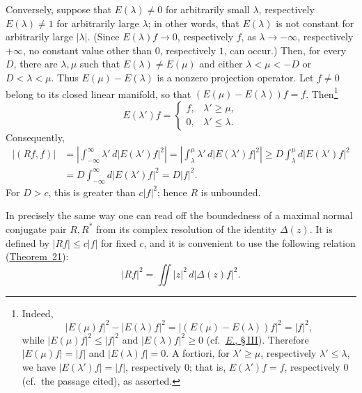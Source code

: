 \documentclass[
  paper=b5,
  twoside=true,
  fontsize=13pt,
  headings=normal,
  bookmarkpackage=false
]{scrartcl}
\theoremstyle{definition}
\newcommand{\TheoremRef}[1]{\hyperref[thm:#1]{Theorem~#1}}
\newcommand{\ErefText}[1]{\href{https://doi.org/10.1007/BF01782338}{#1}}
\begin{document}
Conversely, suppose that \(E(\lambda)\neq0\) for arbitrarily small
\(\lambda\), respectively \(E(\lambda)\neq1\) for arbitrarily large
\(\lambda\); in other words, that \(E(\lambda)\) is not constant for
arbitrarily large \(\lvert\lambda\rvert\).  (Since
\(E(\lambda)f\to0\), respectively \(f\), as
\(\lambda\to-\infty\), respectively \(+\infty\), no constant value other
than \(0\), respectively \(1\), can occur.)  Then, for every \(D\), there
are \(\lambda,\mu\) such that \(E(\lambda)\neq E(\mu)\) and either
\(\lambda<\mu<-D\) or \(D<\lambda<\mu\).  Thus \(E(\mu)-E(\lambda)\) is a
nonzero projection operator.  Let \(f\neq0\) belong to its closed linear
manifold, so that \((E(\mu)-E(\lambda))f=f\).
Then\footnote{\label{fn:70}Indeed,
\[
  \lvert E(\mu)f\rvert^{2}-\lvert E(\lambda)f\rvert^{2}
  =
  \lvert(E(\mu)-E(\lambda))f\rvert^{2}
  =
  \lvert f\rvert^{2},
\]
while \(\lvert E(\mu)f\rvert^{2}\leq\lvert f\rvert^{2}\) and
\(\lvert E(\lambda)f\rvert^{2}\geq0\) (cf.\ \ErefText{\emph{E.}, \S\,III}).  Therefore
\(\lvert E(\mu)f\rvert=\lvert f\rvert\) and
\(\lvert E(\lambda)f\rvert=0\).  A fortiori, for
\(\lambda'\geq\mu\), respectively \(\lambda'\leq\lambda\), we have
\(\lvert E(\lambda')f\rvert=\lvert f\rvert\), respectively \(0\);
that is, \(E(\lambda')f=f\), respectively \(0\) (cf.\ the passage cited),
as asserted.}
\[
  E(\lambda')f=
  \begin{cases}
    f,&\lambda'\geq\mu,\\
    0,&\lambda'\leq\lambda.
  \end{cases}
\]
Consequently,
\begin{align*}
  \lvert(Rf,f)\rvert
  &=
  \left\lvert
  \int_{-\infty}^{\infty}
  \lambda'\,d\lvert E(\lambda')f\rvert^{2}
  \right\rvert
  =
  \left\lvert
  \int_{\lambda}^{\mu}
  \lambda'\,d\lvert E(\lambda')f\rvert^{2}
  \right\rvert
  \geq
  D\int_{\lambda}^{\mu}d\lvert E(\lambda')f\rvert^{2}\\
  &=
  D\int_{-\infty}^{\infty}d\lvert E(\lambda')f\rvert^{2}
  =
  D\lvert f\rvert^{2}.
\end{align*}
For \(D>c\), this is greater than \(c\lvert f\rvert^{2}\); hence \(R\) is
unbounded.

In precisely the same way one can read off the boundedness of a maximal
normal conjugate pair \(R,R^{*}\) from its complex resolution of the
identity \(\Delta(z)\).  It is defined by \(\lvert Rf\rvert\leq c\lvert f\rvert\) for fixed \(c\),
and it is convenient to use the following relation (\TheoremRef{21}):
\[
  \lvert Rf\rvert^{2}
  =
  \iint\lvert z\rvert^{2}\,d\lvert\Delta(z)f\rvert^{2}.
\]
\end{document}
